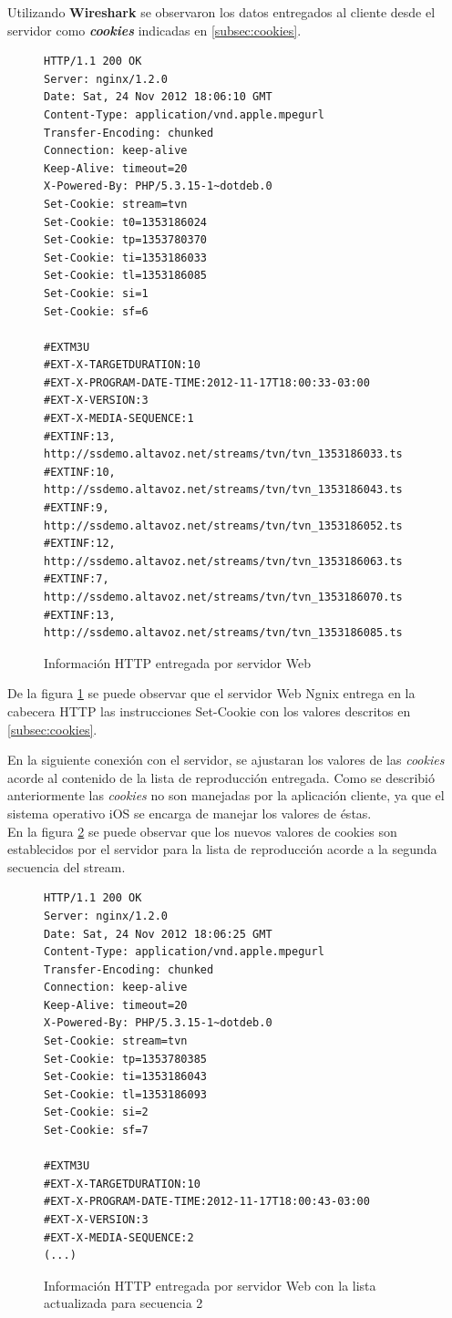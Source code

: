 Utilizando \textbf{Wireshark} se observaron los datos entregados al cliente desde el servidor como \textit{\textbf{cookies}} indicadas en \ref{subsec:cookies}.

\begin{figure}[H]
	\centering
\begin{lstlisting}
HTTP/1.1 200 OK
Server: nginx/1.2.0
Date: Sat, 24 Nov 2012 18:06:10 GMT
Content-Type: application/vnd.apple.mpegurl
Transfer-Encoding: chunked
Connection: keep-alive
Keep-Alive: timeout=20
X-Powered-By: PHP/5.3.15-1~dotdeb.0
Set-Cookie: stream=tvn
Set-Cookie: t0=1353186024
Set-Cookie: tp=1353780370
Set-Cookie: ti=1353186033
Set-Cookie: tl=1353186085
Set-Cookie: si=1
Set-Cookie: sf=6

#EXTM3U
#EXT-X-TARGETDURATION:10
#EXT-X-PROGRAM-DATE-TIME:2012-11-17T18:00:33-03:00
#EXT-X-VERSION:3
#EXT-X-MEDIA-SEQUENCE:1
#EXTINF:13,
http://ssdemo.altavoz.net/streams/tvn/tvn_1353186033.ts
#EXTINF:10,
http://ssdemo.altavoz.net/streams/tvn/tvn_1353186043.ts
#EXTINF:9,
http://ssdemo.altavoz.net/streams/tvn/tvn_1353186052.ts
#EXTINF:12,
http://ssdemo.altavoz.net/streams/tvn/tvn_1353186063.ts
#EXTINF:7,
http://ssdemo.altavoz.net/streams/tvn/tvn_1353186070.ts
#EXTINF:13,
http://ssdemo.altavoz.net/streams/tvn/tvn_1353186085.ts
\end{lstlisting}
\caption{Información HTTP entregada por servidor Web}
\label{lst:setcookies}
\end{figure}

De la figura \ref{lst:setcookies} se puede observar que el servidor Web Ngnix\cite{bib:ngnix-homepage} entrega en la cabecera HTTP las instrucciones Set-Cookie con los valores descritos en \ref{subsec:cookies}. 

En la siguiente conexión con el servidor, se ajustaran los valores de las \textit{cookies} acorde al contenido de la lista de reproducción entregada. Como se describió anteriormente las \textit{cookies} no son manejadas por la aplicación cliente, ya que el sistema operativo iOS se encarga de manejar los valores de éstas.\\

En la figura \ref{lst:sequence2} se puede observar que los nuevos valores de cookies son establecidos por el servidor para la lista de reproducción acorde a la segunda secuencia del stream.

\begin{figure}[H]
	\centering
\begin{lstlisting}
HTTP/1.1 200 OK
Server: nginx/1.2.0
Date: Sat, 24 Nov 2012 18:06:25 GMT
Content-Type: application/vnd.apple.mpegurl
Transfer-Encoding: chunked
Connection: keep-alive
Keep-Alive: timeout=20
X-Powered-By: PHP/5.3.15-1~dotdeb.0
Set-Cookie: stream=tvn
Set-Cookie: tp=1353780385
Set-Cookie: ti=1353186043
Set-Cookie: tl=1353186093
Set-Cookie: si=2
Set-Cookie: sf=7

#EXTM3U
#EXT-X-TARGETDURATION:10
#EXT-X-PROGRAM-DATE-TIME:2012-11-17T18:00:43-03:00
#EXT-X-VERSION:3
#EXT-X-MEDIA-SEQUENCE:2
(...)
\end{lstlisting}
\caption{Información HTTP entregada por servidor Web con la lista actualizada para secuencia 2}
\label{lst:sequence2}
\end{figure}



